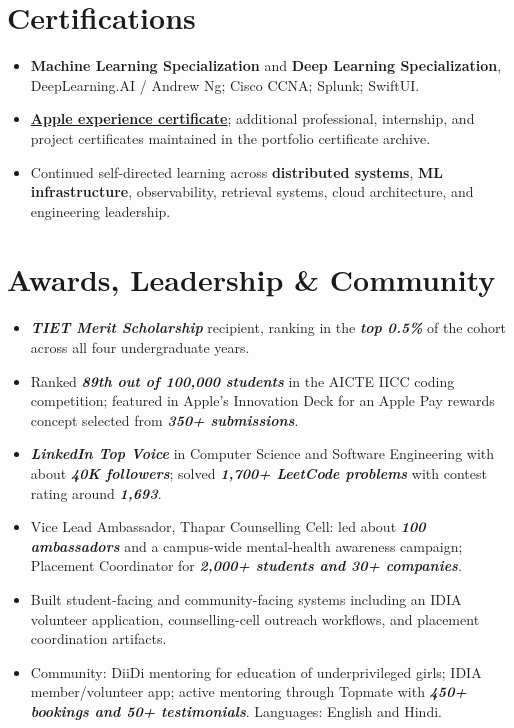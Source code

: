 \documentclass[10pt,a4paper]{article}
\newcommand{\metric}[1]{\textbf{\textit{#1}}}
\newcommand{\tech}[1]{\textbf{#1}}
\begin{document}
\section{Certifications}
\begin{itemize}
  \item \textbf{Machine Learning Specialization} and \textbf{Deep Learning Specialization}, DeepLearning.AI / Andrew Ng; Cisco CCNA; Splunk; SwiftUI.
  \item \href{https://drive.google.com/file/d/15i68a5YuADLoaKJDZuCyz88tcQldIJK9/view?usp=sharing}{\textbf{Apple experience certificate}}; additional professional, internship, and project certificates maintained in the portfolio certificate archive.
  \item Continued self-directed learning across \tech{distributed systems}, \tech{ML infrastructure}, observability, retrieval systems, cloud architecture, and engineering leadership.
\end{itemize}

\section{Awards, Leadership \& Community}
\begin{itemize}
  \item \metric{TIET Merit Scholarship} recipient, ranking in the \metric{top 0.5\%} of the cohort across all four undergraduate years.
  \item Ranked \metric{89th out of 100,000 students} in the AICTE IICC coding competition; featured in Apple's Innovation Deck for an Apple Pay rewards concept selected from \metric{350+ submissions}.
  \item \metric{LinkedIn Top Voice} in Computer Science and Software Engineering with about \metric{40K followers}; solved \metric{1,700+ LeetCode problems} with contest rating around \metric{1,693}.
  \item Vice Lead Ambassador, Thapar Counselling Cell: led about \metric{100 ambassadors} and a campus-wide mental-health awareness campaign; Placement Coordinator for \metric{2,000+ students and 30+ companies}.
  \item Built student-facing and community-facing systems including an IDIA volunteer application, counselling-cell outreach workflows, and placement coordination artifacts.
  \item Community: DiiDi mentoring for education of underprivileged girls; IDIA member/volunteer app; active mentoring through Topmate with \metric{450+ bookings and 50+ testimonials}. Languages: English and Hindi.
\end{itemize}
\end{document}
